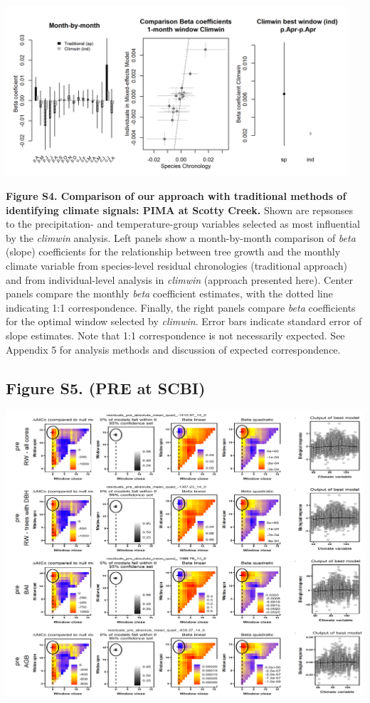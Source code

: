 \documentclass[
]{article}
\begin{document}
\includegraphics[width=0.95\textwidth,height=\textheight]{tables_figures/SI_figures/traditional_comparison/climwin_vs_dcc_ScottyCreek_PIMA_tmx.png}

\textbf{Figure S4. Comparison of our approach with traditional methods
of identifying climate signals: PIMA at Scotty Creek.} Shown are
repsonses to the precipitation- and temperature-group variables selected
as most influential by the \emph{climwin} analysis. Left panels show a
month-by-month comparison of \emph{beta} (slope) coefficients for the
relationship between tree growth and the monthly climate variable from
species-level residual chronologies (traditional approach) and from
individual-level analysis in \emph{climwin} (approach presented here).
Center panels compare the monthly \emph{beta} coefficient estimates,
with the dotted line indicating 1:1 correspondence. Finally, the right
panels compare \emph{beta} coefficients for the optimal window selected
by \emph{climwin}. Error bars indicate standard error of slope
estimates. Note that 1:1 correspondence is not necessarily expected. See
Appendix 5 for analysis methods and discussion of expected
correspondence.

\newpage

\hypertarget{figure-s5.-pre-at-scbi}{%
\subsection{Figure S5. (PRE at SCBI)}\label{figure-s5.-pre-at-scbi}}

\includegraphics{tables_figures/SI_figures/climwin_plots_combined/SCBI_pre.png}
\end{document}

